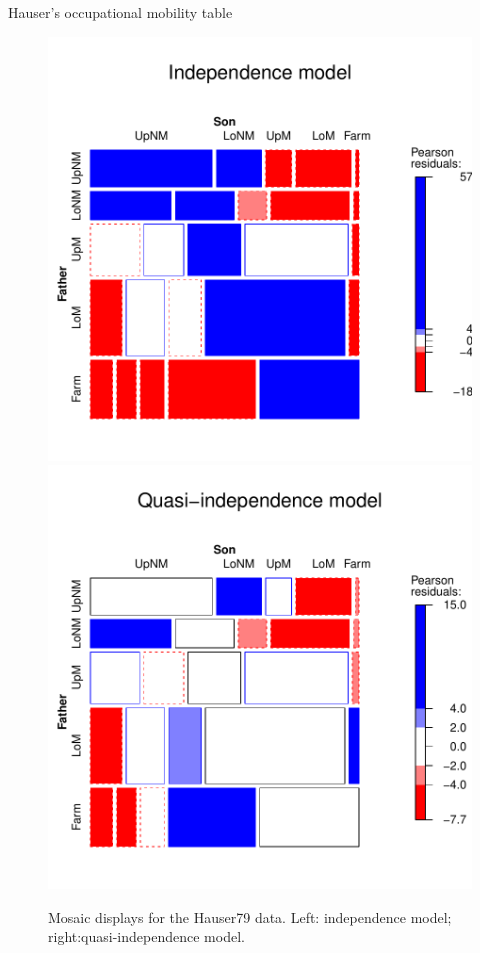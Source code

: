 \documentclass[11pt]{book}\usepackage[]{graphicx}\usepackage[]{color}
\newenvironment{knitrout}{}{} %
\renewenvironment{knitrout}{\small\renewcommand{\baselinestretch}{.85}}{} %
\begin{document}
\begin{Example}[hauser1]{Hauser's occupational mobility table}
\begin{knitrout}
\begin{figure}[!htbp]
\centerline{\includegraphics[width=.49\textwidth]{ch08/fig/hauser-mosaic1-1} 
\includegraphics[width=.49\textwidth]{ch08/fig/hauser-mosaic1-2} }

\caption[Mosaic displays for the Hauser79 data]{Mosaic displays for the Hauser79 data. Left: independence model; right:quasi-independence model.\label{fig:hauser-mosaic1}}
\end{figure}


\end{knitrout}


\end{Example}
\end{document}
